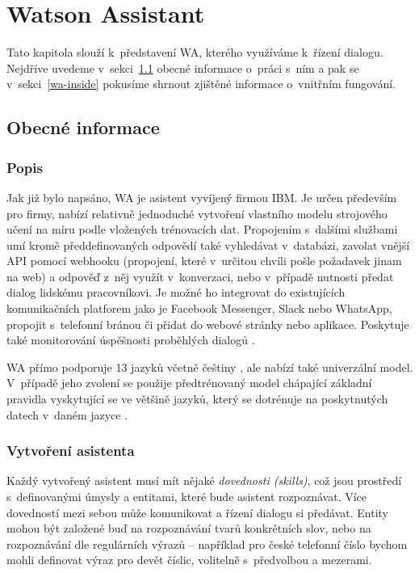 \chapter{Watson Assistant}\label{chapter-wa}

Tato kapitola slouží k~představení WA,
kterého využíváme k~řízení dialogu.
Nejdříve uvedeme v~sekci~\ref{wa-common} obecné informace
o~práci s~ním a pak se v~sekci~\ref{wa-inside} pokusíme shrnout zjištěné
informace o~vnitřním fungování.

\section{Obecné informace}\label{wa-common}

\subsection{Popis}

Jak již bylo napsáno, WA je asistent vyvíjený firmou IBM.
Je určen především pro firmy, nabízí relativně jednoduché vytvoření
vlastního modelu strojového učení na míru podle vložených trénovacích
dat. Propojením s~dalšími službami umí kromě předdefinovaných odpovědí
také vyhledávat v~databázi, zavolat vnější API pomocí webhooku (propojení,
které v~určitou chvíli pošle požadavek jinam na web) a odpověď
z~něj využít v~konverzaci, nebo v~případě nutnosti předat dialog lidskému
pracovníkovi. Je možné ho integrovat do existujících komunikačních platforem
jako je Facebook Messenger, Slack nebo WhatsApp, propojit s~telefonní
bránou či přidat do webové stránky nebo aplikace. Poskytuje také monitorování
úspěšnosti proběhlých dialogů \citep{wa_about}.

WA přímo podporuje 13 jazyků včetně
češtiny \citep{wa_languages}, ale nabízí také univerzální model. V~případě
jeho zvolení se použije předtrénovaný model chápající základní pravidla
vyskytující se ve většině jazyků, který se dotrénuje na poskytnutých
datech v~daném jazyce \citep{wa_universal_model}.

\subsection{Vytvoření asistenta}\label{wa-create}

Každý vytvořený asistent musí mít nějaké \textit{dovednosti (skills)},
což jsou prostředí s~definovanými úmysly a entitami, které bude asistent
rozpoznávat. Více dovedností mezi sebou může komunikovat
a řízení dialogu si předávat. Entity mohou být založené buď na rozpoznávání tvarů
konkrétních slov, nebo na rozpoznávání dle regulárních výrazů -- například
pro české telefonní
číslo bychom mohli definovat výraz pro devět číslic, volitelně
s~předvolbou a mezerami.

